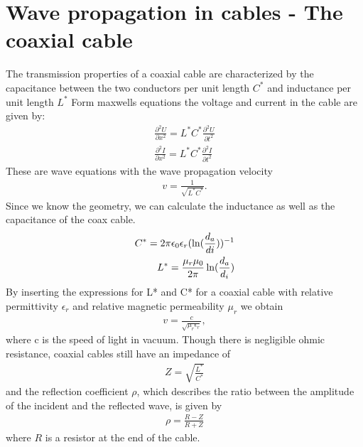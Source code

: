 \documentclass[a4paper,10pt,twocolumn]{article}
\begin{document}
    \section{Wave propagation in cables - The coaxial cable}
    The transmission properties of a coaxial cable are characterized by the capacitance between the two conductors per unit length $C^*$ and inductance per unit length $L^*$
    Form maxwells equations the voltage and current in the cable are given by:
    \begin{align*}
        \frac{\partial^2U}{\partial x^2}=L^*C^*\frac{\partial^2U}{\partial t^2}\\
        \frac{\partial^2I}{\partial x^2}=L^*C^*\frac{\partial^2I}{\partial t^2}
    \end{align*}
    These are wave equations with the wave propagation velocity
    \begin{align}
        \label{coaxial:vel}
        v = \frac{1}{\sqrt{L^*C^*}}.
    \end{align}
    Since we know the geometry, we can calculate the inductance as well as the capacitance of the coax cable.
    \begin{align}
        C^* = 2\pi\epsilon_0\epsilon_r (\ln(\frac{d_a}{di}))^{-1}\endline
        L^* = \frac{\mu_r\mu_0}{2\pi}\ln(\frac{d_a}{d_i})
        \end{align}
    By inserting the expressions for L* and C* for a coaxial cable with relative permittivity $\epsilon_r$ and relative magnetic permeability $\mu_r$ we obtain
    \begin{align}
        \label{eq:vavePropagationVelocity}
        v = \frac{c}{\sqrt{\mu_r\epsilon_r}},
    \end{align}
    where c is the speed of light in vacuum.
    Though there is negligible ohmic resistance, coaxial cables still have an impedance of
    \begin{align}
        Z=\sqrt{\frac{L^*}{C^*}}
    \end{align}
    and the reflection coefficient $\rho$, which describes the ratio between the amplitude of the incident and the reflected wave, is given by
    \begin{align}
        \label{eq:coaxRef}
        \rho=\frac{R-Z}{R+Z}
    \end{align}
    where $R$ is a resistor at the end of the cable.
\end{document}
